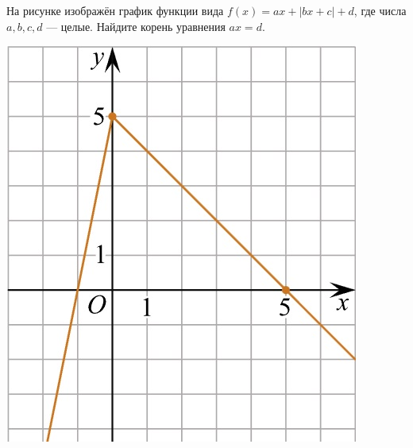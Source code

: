 \begin{class}[number=5]
\begin{listofex}
		\item
		\begin{minipage}[t]{0.7\textwidth}
			На рисунке изображён график функции вида \(f(x)=ax+|bx+c|+d\), где числа \(a, b, c, d\) --- целые. Найдите корень уравнения \(ax=d\).
		\end{minipage}
		\begin{minipage}[c]{0.27\textwidth}
			\includegraphics[align=t, width=\textwidth]{pics/G101M4C5-10.jpg}
		\end{minipage}
	\end{listofex}
\end{class}
%
%
%
%	
%
%
%	
%
%
%	
